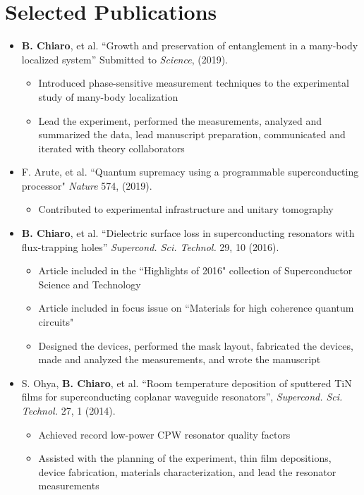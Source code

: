 \documentclass[letterpaper,11pt]{article}
\newcommand{\resumeItem}[2]{
\item \small{#1{#2 \vspace{-2pt} }
}
}
\newcommand{\resumeSubItem}[2]{\vspace{-4pt}\resumeItem{#1}{#2}}
\newcommand{\resumeSubHeadingListStart}{\begin{itemize}[leftmargin=*]}
\newcommand{\resumeSubHeadingListEnd}{\end{itemize}}
\begin{document}
\section{Selected Publications}
\vspace{5pt}
\resumeSubHeadingListStart
\resumeSubItem{
\textbf{B. Chiaro}, et al.  “Growth and preservation of entanglement in a many-body localized system” Submitted to \textit{Science}, (2019).
}{}
\vspace{-5pt}
\begin{itemize}
\item Introduced phase-sensitive measurement techniques to the experimental study of many-body localization
\item Lead the experiment, performed the measurements, analyzed and summarized the data, lead manuscript preparation, communicated and iterated with theory collaborators\\
\end{itemize}

\resumeSubItem{
F. Arute, et al. ``Quantum supremacy using a programmable superconducting processor" \textit{Nature} 574, (2019).
}{}
\vspace{-5pt}
\begin{itemize}
\item{Contributed to experimental infrastructure and unitary tomography}
\end{itemize}

\resumeSubItem{
\textbf{B. Chiaro}, et al.  “Dielectric surface loss in superconducting resonators with flux-trapping holes” \textit{Supercond. Sci. Technol.} 29, 10 (2016).
}{}
\vspace{-5pt}
\begin{itemize}
\item Article included in the ``Highlights of 2016" collection of Superconductor Science and Technology
\item Article included in focus issue on ``Materials for high coherence quantum circuits"
\item Designed the devices, performed the mask layout, fabricated the devices, made and analyzed the measurements, and wrote the manuscript
\end{itemize}

\resumeSubItem{S. Ohya, \textbf{B. Chiaro}, et al. “Room temperature deposition of sputtered TiN films for superconducting coplanar waveguide resonators”, \textit{Supercond. Sci. Technol.} 27, 1 (2014).
}{}
\vspace{-5pt}
\begin{itemize}
\item Achieved record low-power CPW resonator quality factors
\item Assisted with the planning of the experiment, thin film depositions, device fabrication, materials characterization, and lead the resonator measurements
\end{itemize}
\resumeSubHeadingListEnd
\end{document}
